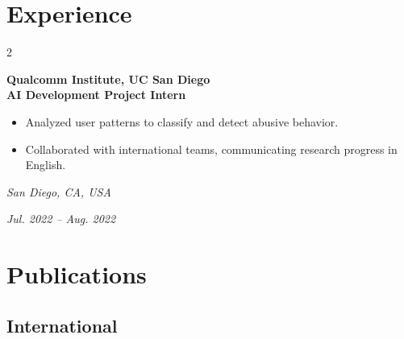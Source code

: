\documentclass[10pt, letterpaper]{article}
\newenvironment{highlights}{
    \begin{itemize}[
        topsep=0.10 cm,
        parsep=0.10 cm,
        partopsep=0pt,
        itemsep=0pt,
        leftmargin=0.4 cm + 10pt
    ]
}{
    \end{itemize}
} %
\newenvironment{twocolentry}[2][]{
    \onecolentry
    \def\secondColumn{#2}
    \setcolumnwidth{\fill, 3.5 cm}
    \begin{paracol}{2}
}{
    \switchcolumn \raggedleft \secondColumn
    \end{paracol}
    \endonecolentry
} %
\begin{document}
    \vspace{0.2 cm}
            
    \section{Experience}

    \begin{twocolentry}{
        \small\textit{San Diego, CA, USA}
        
        \vspace{0.2cm}
        
        \textit{Jul. 2022 – Aug. 2022}
    }
        \textbf{\color{headingOrange}Qualcomm Institute, UC San Diego} \\
        \textbf{AI Development Project Intern}
        \begin{highlights}
            \item Analyzed user patterns to classify and detect abusive behavior.
            \item Collaborated with international teams, communicating research progress in English. 
        \end{highlights}
    \end{twocolentry}



    \vspace{0.2 cm}
    \section{Publications}
    \subsection{International}
\end{document}
